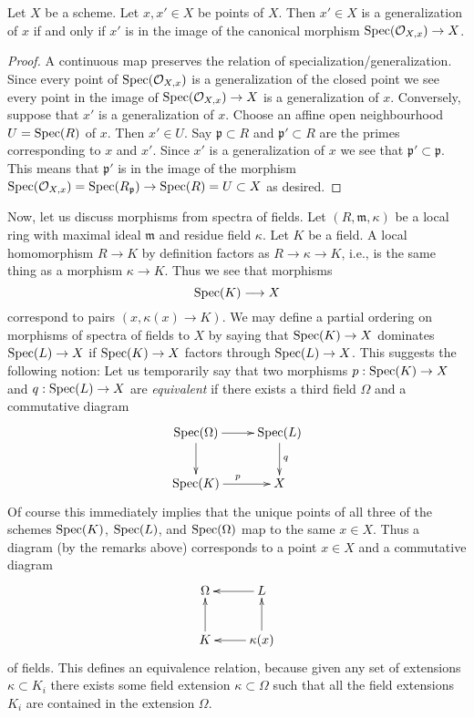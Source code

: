 \begin{lemma}
\label{lemma-specialize-points}
Let $X$ be a scheme.
Let $x, x' \in X$ be points of $X$.
Then $x' \in X$ is a generalization of $x$ if and only if
$x'$ is in the image of the canonical morphism
$\mathop{\rm Spec}(\mathcal{O}_{X, x}) \to X$.
\end{lemma}

\begin{proof}
A continuous map preserves the relation of specialization/generalization.
Since every point of $\mathop{\rm Spec}(\mathcal{O}_{X, x})$ is a
generalization of the closed point we see every point in the image
of $\mathop{\rm Spec}(\mathcal{O}_{X, x}) \to X$ is a generalization of $x$.
Conversely, suppose that $x'$ is a generalization of $x$.
Choose an affine open neighbourhood $U = \mathop{\rm Spec}(R)$ of
$x$. Then $x' \in U$. Say $\mathfrak p \subset R$ and
$\mathfrak p' \subset R$ are the primes corresponding
to $x$ and $x'$. Since $x'$ is a generalization of $x$
we see that $\mathfrak p' \subset \mathfrak p$. This means
that $\mathfrak p'$ is in the image of the morphism
$\mathop{\rm Spec}(\mathcal{O}_{X, x}) = \mathop{\rm Spec}(R_{\mathfrak p})
\to \mathop{\rm Spec}(R) = U \subset X$ as desired.
\end{proof}

\noindent
Now, let us discuss morphisms from spectra of fields.
Let $(R, \mathfrak m, \kappa)$ be a local ring
with maximal ideal $\mathfrak m$ and residue field $\kappa$.
Let $K$ be a field. A local homomorphism $R \to K$ by definition
factors as $R \to \kappa \to K$, i.e., is the same thing as
a morphism $\kappa \to K$. Thus we see that morphisms
$$
\mathop{\rm Spec}(K) \longrightarrow X
$$
correspond to pairs $(x, \kappa(x) \to K)$. We may define
a partial ordering on morphisms of spectra of fields to $X$
by saying that $\mathop{\rm Spec}(K) \to X$ dominates
$\mathop{\rm Spec}(L) \to X$ if $\mathop{\rm Spec}(K) \to X$
factors through $\mathop{\rm Spec}(L) \to X$. This suggests
the following notion: Let us temporarily
say that two morphisms $p : \mathop{\rm Spec}(K) \to X$ and
$q : \mathop{\rm Spec}(L) \to X$ are {\it equivalent} if there exists
a third field $\Omega$ and a commutative diagram
$$
\xymatrix{
\Spec(\Omega) \ar[r] \ar[d] &
\Spec(L) \ar[d]^q \\
\Spec(K) \ar[r]^p &
X
}
$$
Of course this immediately implies that the unique points of
all three of the schemes $\mathop{\rm Spec}(K)$,
$\mathop{\rm Spec}(L)$, and $\mathop{\rm Spec}(\Omega)$
map to the same $x \in X$. Thus a diagram (by the remarks above)
corresponds to a point $x \in X$ and a commutative diagram
$$
\xymatrix{
\Omega &
L \ar[l] \\
K \ar[u] &
\kappa(x) \ar[l] \ar[u]
}
$$
of fields. This defines an equivalence relation, because given
any set of extensions $\kappa \subset K_i$ there exists
some field extension $\kappa \subset \Omega$ such that all
the field extensions $K_i$ are contained in the extension $\Omega$.


